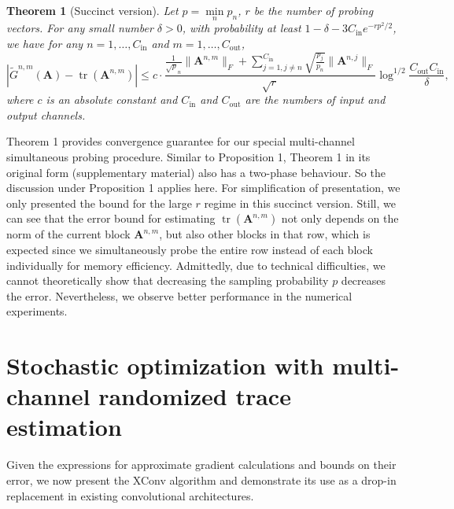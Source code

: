 \documentclass[10pt]{article}
\newcommand{\B}{\mathbf}
\newtheorem{theorem}{Theorem}
\begin{document}
\begin{theorem}[Succinct version]Let $p=\min\limits_n p_n$, $r$ be the number of probing vectors. For any small number $\delta>0$, with probability at least $1-\delta- 3C_{\text{in}}e^{-rp^2/2}$, we have for any $n=1,\ldots, C_{\text{in}}$ and $m=1,\ldots, C_{\text{out}}$,
\[\left|\widetilde{G}^{n, m}(\B{A})-\operatorname{tr}(\B{A}^{n,m})\right| \leq c \cdot  \frac{\frac{1}{\sqrt p_n}\|\B{A}^{n,m}\|_F +\sum\limits_{j=1,j\neq n}^{C_{\text{in}}} \sqrt{\frac{p_j}{p_n}}\|\B{A}^{n,j}\|_F}{\sqrt {r}} \log^{1/2} \frac{C_{\text{out}}C_{\text{in}}}{\delta}, \]
where $c$ is an absolute constant and $C_{\text{in}}$ and $C_{\text{out}}$ are the numbers of input and output channels.
\label{theorem1}
\end{theorem}
Theorem 1 provides convergence guarantee for our special multi-channel simultaneous probing procedure. Similar to Proposition 1, Theorem 1 in its original form (supplementary material) also has a two-phase behaviour. So the discussion under Proposition 1 applies here. For simplification of presentation, we only presented the bound for the large $r$ regime in this succinct version. Still, we can see that the error bound for estimating $\operatorname{tr}(\B{A}^{n,m})$ not only depends on the norm of the current block $\B{A}^{n,m}$, but also other blocks in that row, which is expected since we simultaneously probe the entire row instead of each block individually for memory efficiency. Admittedly, due to technical difficulties, we cannot theoretically show that decreasing the sampling probability $p$ decreases the error. Nevertheless, we observe better performance in the numerical experiments.



\section{Stochastic optimization with multi-channel randomized trace estimation}
\label{sec:rand_trace}
Given the expressions for approximate gradient calculations and bounds on their error, we now present the XConv algorithm and demonstrate its use as a drop-in replacement in existing convolutional architectures.
\end{document}
